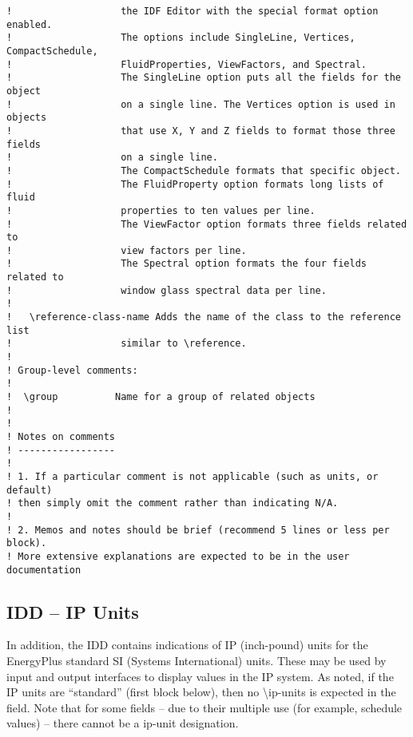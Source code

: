 \begin{lstlisting}
!                   the IDF Editor with the special format option enabled.
!                   The options include SingleLine, Vertices, CompactSchedule,
!                   FluidProperties, ViewFactors, and Spectral.
!                   The SingleLine option puts all the fields for the object
!                   on a single line. The Vertices option is used in objects
!                   that use X, Y and Z fields to format those three fields
!                   on a single line.
!                   The CompactSchedule formats that specific object.
!                   The FluidProperty option formats long lists of fluid
!                   properties to ten values per line.
!                   The ViewFactor option formats three fields related to
!                   view factors per line.
!                   The Spectral option formats the four fields related to
!                   window glass spectral data per line.
!
!   \reference-class-name Adds the name of the class to the reference list
!                   similar to \reference.
!
! Group-level comments:
!
!  \group          Name for a group of related objects
!
!
! Notes on comments
! -----------------
!
! 1. If a particular comment is not applicable (such as units, or default)
! then simply omit the comment rather than indicating N/A.
!
! 2. Memos and notes should be brief (recommend 5 lines or less per block).
! More extensive explanations are expected to be in the user documentation
\end{lstlisting}

\subsection{IDD -- IP Units}\label{idd-ip-units}

In addition, the IDD contains indications of IP (inch-pound) units for the EnergyPlus standard SI (Systems International) units. These may be used by input and output interfaces to display values in the IP system. As noted, if the IP units are ``standard'' (first block below), then no \textbackslash{}ip-units is expected in the field. Note that for some fields -- due to their multiple use (for example, schedule values) -- there cannot be a ip-unit designation.

